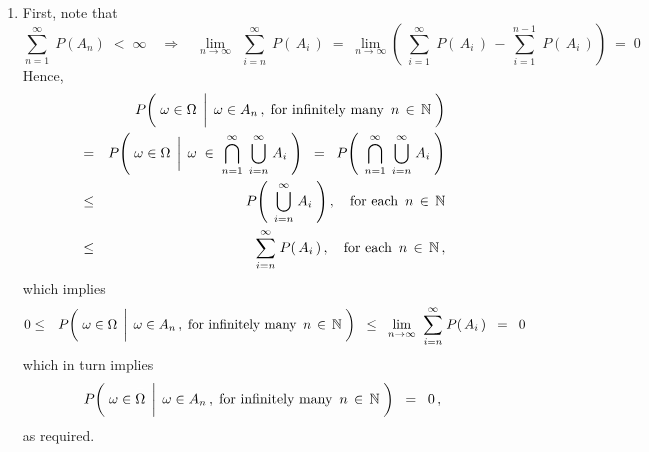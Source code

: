 \begin{enumerate}
\item
	First, note that
	\begin{equation*}
	\overset{\infty}{\underset{n=1}{\sum}}\;P(A_{n}) \; < \; \infty
	\quad\Longrightarrow\quad
		\underset{n\rightarrow\infty}{\lim}\;\,\overset{\infty}{\underset{i=n}{\sum}} \; P\!\left(\,A_{i}\,\right)
		\; = \;
			\underset{n\rightarrow\infty}{\lim}
			\left(\;
				\overset{\infty}{\underset{i=1}{\sum}} \; P\!\left(\,A_{i}\,\right)
				\, - \,
				\overset{n-1}{\underset{i=1}{\sum}} \; P\!\left(\,A_{i}\,\right)
				\right)
		\; = \;
			0
	\end{equation*}
	Hence,
	\begin{eqnarray*}
	&&
		P\!\left(\,
			\left.
			\omega \in \overset{{\color{white}-}}{\Omega}
			\,\;\right\vert\;
			\omega \in A_{n}\,,\;\textnormal{for infinitely many \,$n\,\in\,\N$}
			\;\right)
	\\
	& = &
		P\!\left(\,
			\left.
			\omega \in \overset{{\color{white}-}}{\Omega}
			\,\;\right\vert\;
			\omega \;\in\; \overset{\infty}{\underset{n=1}{\bigcap}} \;\, \overset{\infty}{\underset{i=n}{\bigcup}}\;A_{i}
			\;\right)
		\;\; = \;\;
		P\!\left(\;\,
			\overset{\infty}{\underset{n=1}{\bigcap}} \;\, \overset{\infty}{\underset{i=n}{\bigcup}}\;A_{i}
			\;\right)
	\\
	& \leq &
		P\!\left(\;\,
			\overset{\infty}{\underset{i=n}{\bigcup}}\;A_{i}
			\;\right),
		\quad
		\textnormal{for each \,$n \,\in\, \N$}
	\\
	& \leq &
		\overset{\infty}{\underset{i=n}{\sum}} \; P\!\left(\,A_{i}\,\right),
		\quad
		\textnormal{for each \,$n \,\in\, \N$}\,,
	\end{eqnarray*}
	which implies
	\begin{eqnarray*}
	0
	& \leq &
		P\!\left(\,
			\left.
			\omega \in \overset{{\color{white}-}}{\Omega}
			\,\;\right\vert\;
			\omega \in A_{n}\,,\;\textnormal{for infinitely many \,$n\,\in\,\N$}
			\;\right)
		\;\; \leq \;\;
		\underset{n\rightarrow\infty}{\lim}\;\; \overset{\infty}{\underset{i=n}{\sum}} \; P\!\left(\,A_{i}\,\right)
		\;\; = \;\; 0
	\end{eqnarray*}
	which in turn implies
	\begin{eqnarray*}
	P\!\left(\,
		\left.
		\omega \in \overset{{\color{white}-}}{\Omega}
		\,\;\right\vert\;
		\omega \in A_{n}\,,\;\textnormal{for infinitely many \,$n\,\in\,\N$}
		\;\right)
	\;\; = \;\; 0\,,
	\end{eqnarray*}
	as required.
	

\end{enumerate}
